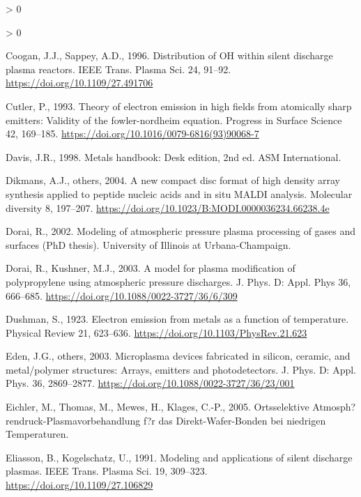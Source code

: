 \documentclass[
  11pt,
  twoside]{article}
\newlength{\cslhangindent}
\newenvironment{CSLReferences}[2] %
 {%
  \setlength{\parindent}{0pt}
  \ifodd #1 \everypar{\setlength{\hangindent}{\cslhangindent}}\ignorespaces\fi
  \ifnum #2 > 0
  \setlength{\parskip}{#2\baselineskip}
  \fi
 }%
 {}
\begin{document}
\begin{CSLReferences}{1}{0}
\begin{CSLReferences}{1}{0}
\leavevmode\hypertarget{ref-Coog1996}{}%
Coogan, J.J., Sappey, A.D., 1996. Distribution of {OH} within silent discharge plasma reactors. IEEE Trans. Plasma Sci. 24, 91--92. \url{https://doi.org/10.1109/27.491706}

\leavevmode\hypertarget{ref-Cutl1993}{}%
Cutler, P., 1993. Theory of electron emission in high fields from atomically sharp emitters: Validity of the fowler-nordheim equation. Progress in Surface Science 42, 169--185. \url{https://doi.org/10.1016/0079-6816(93)90068-7}

\leavevmode\hypertarget{ref-Davi1998}{}%
Davis, J.R., 1998. Metals handbook: Desk edition, 2nd ed. ASM International.

\leavevmode\hypertarget{ref-Dikm04}{}%
Dikmans, A.J., others, 2004. A new compact disc format of high density array synthesis applied to peptide nucleic acids and in situ {MALDI} analysis. Molecular diversity 8, 197--207. \url{https://doi.org/10.1023/B:MODI.0000036234.66238.4e}

\leavevmode\hypertarget{ref-Dora02}{}%
Dorai, R., 2002. Modeling of atmospheric pressure plasma processing of gases and surfaces (PhD thesis). University of Illinois at Urbana-Champaign.

\leavevmode\hypertarget{ref-Dora03}{}%
Dorai, R., Kushner, M.J., 2003. A model for plasma modification of polypropylene using atmospheric pressure discharges. J. Phys. D: Appl. Phys 36, 666--685. \url{https://doi.org/10.1088/0022-3727/36/6/309}

\leavevmode\hypertarget{ref-Dush1923}{}%
Dushman, S., 1923. Electron emission from metals as a function of temperature. Physical Review 21, 623--636. \url{https://doi.org/10.1103/PhysRev.21.623}

\leavevmode\hypertarget{ref-Eden03}{}%
Eden, J.G., others, 2003. Microplasma devices fabricated in silicon, ceramic, and metal/polymer structures: Arrays, emitters and photodetectors. J. Phys. D: Appl. Phys. 36, 2869--2877. \url{https://doi.org/10.1088/0022-3727/36/23/001}

\leavevmode\hypertarget{ref-Eich05}{}%
Eichler, M., Thomas, M., Mewes, H., Klages, C.-P., 2005. {Ortsselektive Atmosph?rendruck-Plasmavorbehandlung f?r das Direkt-Wafer-Bonden bei niedrigen Temperaturen}.

\leavevmode\hypertarget{ref-Elia1991}{}%
Eliasson, B., Kogelschatz, U., 1991. Modeling and applications of silent discharge plasmas. IEEE Trans. Plasma Sci. 19, 309--323. \url{https://doi.org/10.1109/27.106829}


\end{CSLReferences}
\end{CSLReferences}
\end{document}
